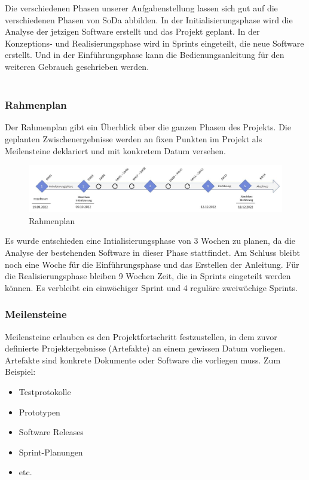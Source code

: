 \documentclass[a4paper, table]{article}
\begin{document}
Die verschiedenen Phasen unserer Aufgabenstellung lassen sich gut auf die verschiedenen Phasen von SoDa abbilden.
In der Initialisierungsphase wird die Analyse der jetzigen Software erstellt und das Projekt geplant.
In der Konzeptions- und Realisierungsphase wird in Sprints eingeteilt, die neue Software erstellt.
Und in der Einführungsphase kann die Bedienungsanleitung für den weiteren Gebrauch geschrieben werden.\\\\

\subsubsection{Rahmenplan}
Der Rahmenplan gibt ein Überblick über die ganzen Phasen des Projekts.
Die geplanten Zwischenergebnisse werden an fixen Punkten im Projekt als Meilensteine deklariert und mit konkretem Datum versehen.

\begin{figure}[h]
    \centering
    \hspace*{-2cm}
    \includegraphics[width=1.3\textwidth]{img/Rahmenplan.jpg}
    \caption{Rahmenplan}
    \label{fig:Rahmenplan}
\end{figure}
Es wurde entschieden eine Intialisierungsphase von 3 Wochen zu planen, da die Analyse der bestehenden Software in dieser Phase stattfindet.
Am Schluss bleibt noch eine Woche für die Einführungsphase und das Erstellen der Anleitung.
Für die Realisierungsphase bleiben 9 Wochen Zeit, die in Sprints eingeteilt werden können.
Es verbleibt ein einwöchiger Sprint und 4 reguläre zweiwöchige Sprints.
\newpage
\subsubsection*{Meilensteine}
Meilensteine erlauben es den Projektfortschritt festzustellen,
in dem zuvor definierte Projektergebnisse (Artefakte) an einem gewissen Datum vorliegen.\\
Artefakte sind konkrete Dokumente oder Software die vorliegen muss. Zum Beispiel:
\begin{itemize}
    \item Testprotokolle
    \item Prototypen
    \item Software Releases
    \item Sprint-Planungen
    \item etc.
\end{itemize}
\end{document}
